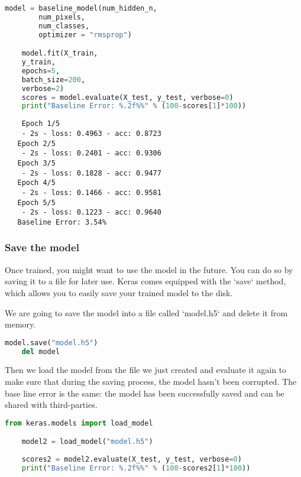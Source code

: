 \begin{lstlisting}[language=Python]
    model = baseline_model(num_hidden_n,
        num_pixels,
        num_classes,
        optimizer = "rmsprop")

    model.fit(X_train,
    y_train, 
    epochs=5,
    batch_size=200,
    verbose=2)
    scores = model.evaluate(X_test, y_test, verbose=0)
    print("Baseline Error: %.2f%%" % (100-scores[1]*100))
\end{lstlisting}

\begin{lstlisting}
    Epoch 1/5
    - 2s - loss: 0.4963 - acc: 0.8723
   Epoch 2/5
    - 2s - loss: 0.2401 - acc: 0.9306
   Epoch 3/5
    - 2s - loss: 0.1828 - acc: 0.9477
   Epoch 4/5
    - 2s - loss: 0.1466 - acc: 0.9581
   Epoch 5/5
    - 2s - loss: 0.1223 - acc: 0.9640
   Baseline Error: 3.54%   
\end{lstlisting}

\subsubsection{Save the model}

Once trained, you might want to use the model in the future. You can do so by saving it to a file for later use. Keras comes equipped with the `save` method, which allows you to easily save your trained model to the disk.

We are going to save the model into a file called `model.h5` and delete it from memory.

\begin{lstlisting}[language=Python]
    model.save("model.h5")
    del model    
\end{lstlisting}

Then we load the model from the file we just created and evaluate it again to make sure that during the saving process, the model hasn't been corrupted. The base line error is the same: the model has been successfully saved and can be shared with third-parties. 

\begin{lstlisting}[language=Python]
    from keras.models import load_model

    model2 = load_model("model.h5")
    
    scores2 = model2.evaluate(X_test, y_test, verbose=0)
    print("Baseline Error: %.2f%%" % (100-scores2[1]*100))    
\end{lstlisting}
